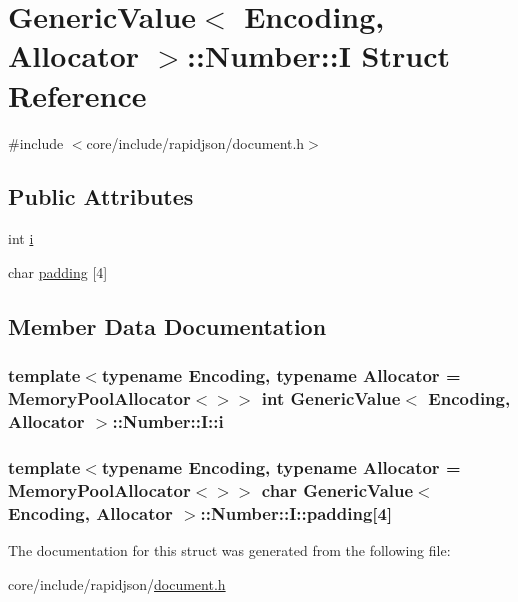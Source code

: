 \hypertarget{structGenericValue_1_1Number_1_1I}{}\section{Generic\+Value$<$ Encoding, Allocator $>$\+:\+:Number\+:\+:I Struct Reference}
\label{structGenericValue_1_1Number_1_1I}


{\ttfamily \#include $<$core/include/rapidjson/document.\+h$>$}

\subsection*{Public Attributes}
\begin{DoxyCompactItemize}
\item 
int \hyperlink{structGenericValue_1_1Number_1_1I_ae0b250dc448d284cf9019f3932bfc380}{i}
\item 
char \hyperlink{structGenericValue_1_1Number_1_1I_aefc064997f30c9c0b2bdce187d1d4cce}{padding} \mbox{[}4\mbox{]}
\end{DoxyCompactItemize}


\subsection{Member Data Documentation}
\subsubsection[{\texorpdfstring{i}{i}}]{\setlength{\rightskip}{0pt plus 5cm}template$<$typename Encoding, typename Allocator = Memory\+Pool\+Allocator$<$$>$$>$ int {\bf Generic\+Value}$<$ Encoding, Allocator $>$\+::Number\+::\+I\+::i}\hypertarget{structGenericValue_1_1Number_1_1I_ae0b250dc448d284cf9019f3932bfc380}{}\label{structGenericValue_1_1Number_1_1I_ae0b250dc448d284cf9019f3932bfc380}
\subsubsection[{\texorpdfstring{padding}{padding}}]{\setlength{\rightskip}{0pt plus 5cm}template$<$typename Encoding, typename Allocator = Memory\+Pool\+Allocator$<$$>$$>$ char {\bf Generic\+Value}$<$ Encoding, Allocator $>$\+::Number\+::\+I\+::padding\mbox{[}4\mbox{]}}\hypertarget{structGenericValue_1_1Number_1_1I_aefc064997f30c9c0b2bdce187d1d4cce}{}\label{structGenericValue_1_1Number_1_1I_aefc064997f30c9c0b2bdce187d1d4cce}


The documentation for this struct was generated from the following file\+:\begin{DoxyCompactItemize}
\item 
core/include/rapidjson/\hyperlink{document_8h}{document.\+h}\end{DoxyCompactItemize}
